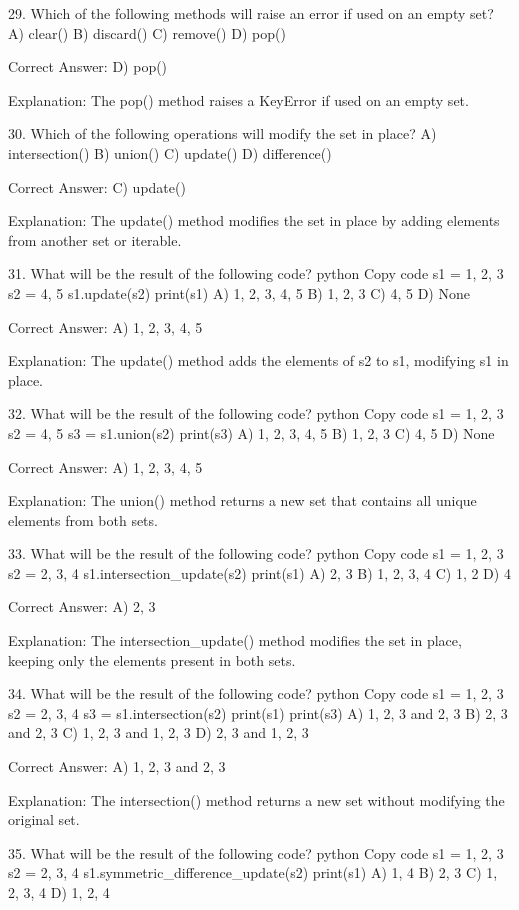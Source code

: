 29. Which of the following methods will raise an error if used on an empty set?
A) clear()
B) discard()
C) remove()
D) pop()

Correct Answer: D) pop()

Explanation:
The pop() method raises a KeyError if used on an empty set.

30. Which of the following operations will modify the set in place?
A) intersection()
B) union()
C) update()
D) difference()

Correct Answer: C) update()

Explanation:
The update() method modifies the set in place by adding elements from another set or iterable.

31. What will be the result of the following code?
python
Copy code
s1 = {1, 2, 3}
s2 = {4, 5}
s1.update(s2)
print(s1)
A) {1, 2, 3, 4, 5}
B) {1, 2, 3}
C) {4, 5}
D) None

Correct Answer: A) {1, 2, 3, 4, 5}

Explanation:
The update() method adds the elements of s2 to s1, modifying s1 in place.

32. What will be the result of the following code?
python
Copy code
s1 = {1, 2, 3}
s2 = {4, 5}
s3 = s1.union(s2)
print(s3)
A) {1, 2, 3, 4, 5}
B) {1, 2, 3}
C) {4, 5}
D) None

Correct Answer: A) {1, 2, 3, 4, 5}

Explanation:
The union() method returns a new set that contains all unique elements from both sets.

33. What will be the result of the following code?
python
Copy code
s1 = {1, 2, 3}
s2 = {2, 3, 4}
s1.intersection_update(s2)
print(s1)
A) {2, 3}
B) {1, 2, 3, 4}
C) {1, 2}
D) {4}

Correct Answer: A) {2, 3}

Explanation:
The intersection_update() method modifies the set in place, keeping only the elements present in both sets.

34. What will be the result of the following code?
python
Copy code
s1 = {1, 2, 3}
s2 = {2, 3, 4}
s3 = s1.intersection(s2)
print(s1)
print(s3)
A) {1, 2, 3} and {2, 3}
B) {2, 3} and {2, 3}
C) {1, 2, 3} and {1, 2, 3}
D) {2, 3} and {1, 2, 3}

Correct Answer: A) {1, 2, 3} and {2, 3}

Explanation:
The intersection() method returns a new set without modifying the original set.

35. What will be the result of the following code?
python
Copy code
s1 = {1, 2, 3}
s2 = {2, 3, 4}
s1.symmetric_difference_update(s2)
print(s1)
A) {1, 4}
B) {2, 3}
C) {1, 2, 3, 4}
D) {1, 2, 4}

